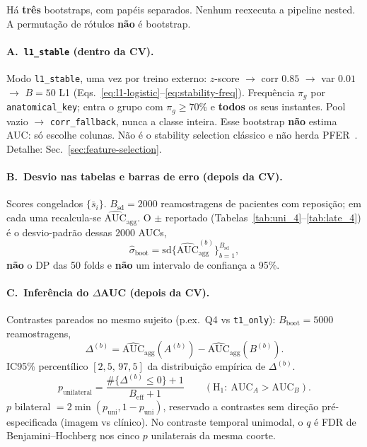 \documentclass[review]{elsarticle}
\newcommand{\code}[1]{\texttt{#1}}
\begin{document}
Há \textbf{três} bootstraps, com papéis separados.
Nenhum reexecuta a pipeline nested.
A permutação de rótulos \textbf{não} é bootstrap.

\paragraph{A.~\code{l1\_stable} (dentro da CV).}
Modo \code{l1\_stable}, uma vez por treino externo: $z$-score $\to$ corr $0.85$ $\to$ var $0.01$ $\to$ $B=50$ L1 (Eqs.~\ref{eq:l1-logistic}--\ref{eq:stability-freq}).
Frequência $\pi_g$ por \code{anatomical\_key}; entra o grupo com $\pi_g\ge 70\%$ e \textbf{todos} os seus instantes.
Pool vazio $\to$ \code{corr\_fallback}, nunca a classe inteira.
Esse bootstrap \textbf{não} estima AUC: só escolhe colunas.
Não é o stability selection clássico e não herda PFER~\cite{bach-2008,meinshausen-2010}.
Detalhe: Sec.~\ref{sec:feature-selection}.

\paragraph{B.~Desvio nas tabelas e barras de erro (depois da CV).}
Scores congelados $\{\bar{s}_i\}$.
$B_{\mathrm{sd}}=2000$ reamostragens de pacientes com reposição; em cada uma recalcula-se $\widehat{\mathrm{AUC}}_{\mathrm{agg}}$.
O $\pm$ reportado (Tabelas~\ref{tab:uni_4}--\ref{tab:late_4}) é o desvio-padrão dessas $2000$ AUCs,
\[
\widehat{\sigma}_{\mathrm{boot}}
= \mathrm{sd}\bigl\{\widehat{\mathrm{AUC}}_{\mathrm{agg}}^{(b)}\bigr\}_{b=1}^{B_{\mathrm{sd}}},
\]
\textbf{não} o DP das 50 folds e \textbf{não} um intervalo de confiança a 95\%.

\paragraph{C.~Inferência do $\Delta$AUC (depois da CV).}
Contrastes pareados no mesmo sujeito (p.ex.\ Q4 vs \code{t1\_only}): $B_{\mathrm{boot}}=5000$ reamostragens,
\[
\Delta^{(b)}
= \widehat{\mathrm{AUC}}_{\mathrm{agg}}(A^{(b)})
- \widehat{\mathrm{AUC}}_{\mathrm{agg}}(B^{(b)}).
\]
IC95\% percentílico $[2{,}5,\,97{,}5]$ da distribuição empírica de $\Delta^{(b)}$.
\[
p_{\mathrm{unilateral}}
= \frac{\#\{\Delta^{(b)}\le 0\}+1}{B_{\mathrm{eff}}+1}
\qquad
(\mathrm{H}_1{:}\ \mathrm{AUC}_A>\mathrm{AUC}_B).
\]
$p$ bilateral $=2\min(p_{\mathrm{uni}},1-p_{\mathrm{uni}})$, reservado a contrastes sem direção pré-especificada (imagem vs clínico).
No contraste temporal unimodal, o $q$ é FDR de Benjamini--Hochberg nos cinco $p$ unilaterais da mesma coorte.
\end{document}
